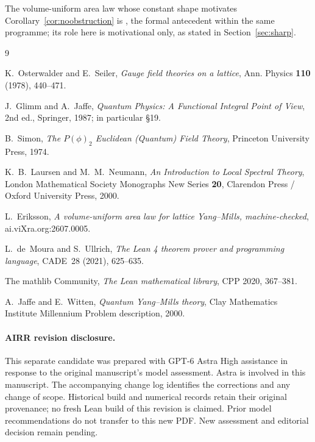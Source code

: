 \documentclass[11pt]{article}
\theoremstyle{definition}
\begin{document}
The volume-uniform area law whose constant shape motivates
Corollary~\ref{cor:noobstruction} is \cite{ErikssonAreaLaw}, the formal
antecedent within the same programme; its role here is motivational only,
as stated in Section~\ref{sec:sharp}.

\begin{thebibliography}{9}

K.~Osterwalder and E.~Seiler,
\emph{Gauge field theories on a lattice},
Ann. Physics \textbf{110} (1978), 440--471.

J.~Glimm and A.~Jaffe,
\emph{Quantum Physics: A Functional Integral Point of View},
2nd ed., Springer, 1987; in particular \S19.

B.~Simon,
\emph{The $P(\phi)_2$ Euclidean (Quantum) Field Theory},
Princeton University Press, 1974.

K.~B.~Laursen and M.~M.~Neumann,
\emph{An Introduction to Local Spectral Theory},
London Mathematical Society Monographs New Series \textbf{20},
Clarendon Press / Oxford University Press, 2000.

L.~Eriksson,
\emph{A volume-uniform area law for lattice Yang--Mills, machine-checked},
ai.viXra.org:2607.0005.

L.~de~Moura and S.~Ullrich,
\emph{The Lean 4 theorem prover and programming language},
CADE~28 (2021), 625--635.

The mathlib Community,
\emph{The Lean mathematical library},
CPP 2020, 367--381.

A.~Jaffe and E.~Witten,
\emph{Quantum Yang--Mills theory},
Clay Mathematics Institute Millennium Problem description, 2000.

\end{thebibliography}


\paragraph{AIRR revision disclosure.}
This separate candidate was prepared with GPT-6 Astra High assistance
in response to the original manuscript's model assessment. Astra is
involved in this manuscript. The accompanying change log identifies
the corrections and any change of scope. Historical build and numerical
records retain their original provenance; no fresh Lean build of this
revision is claimed. Prior model recommendations do not transfer to this
new PDF. New assessment and editorial decision remain pending.
\end{document}
